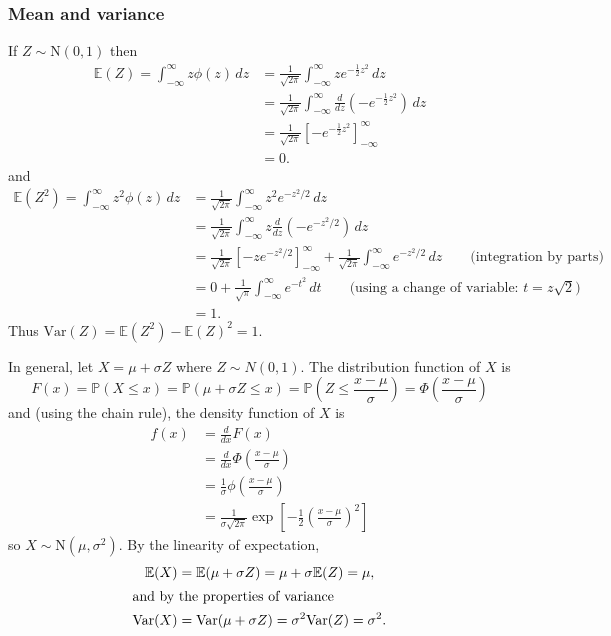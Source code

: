 \documentclass[lecture]{csm}
\newcommand{\prob}{\mathbb{P}}
\newcommand{\expe}{\mathbb{E}}
\newcommand{\var}{\text{Var}}
\begin{document}
\subsubsection*{Mean and variance}
If $Z\sim\text{N}(0,1)$ then
\begin{align*}
\expe(Z) = \int_{-\infty}^{\infty} z \phi(z) \,dz 
	& = \frac{1}{\sqrt{2\pi}}\int_{-\infty}^{\infty} z e^{-\frac{1}{2}z^2} \,dz \\
	& = \frac{1}{\sqrt{2\pi}}\int_{-\infty}^{\infty} \frac{d}{dz}(-e^{-\frac{1}{2}z^2}) \,dz \\
	& = \frac{1}{\sqrt{2\pi}}\left[ -e^{-\frac{1}{2}z^2} \right]_{-\infty}^{\infty} \\
	& = 0. 
\end{align*}
and
\begin{align*}
\expe(Z^2) 
	= \int_{-\infty}^{\infty} z^2 \phi(z)\,dz 
	& = \frac{1}{\sqrt{2\pi}}\int_{-\infty}^{\infty} z^2 e^{-z^2/2} \,dz \\
	& = \frac{1}{\sqrt{2\pi}}\int_{-\infty}^{\infty} z\frac{d}{dz}(-e^{-z^2/2}) \,dz \\
	& = \frac{1}{\sqrt{2\pi}}\left[ -ze^{-z^2/2} \right]_{-\infty}^{\infty} + \frac{1}{\sqrt{2\pi}}\int_{-\infty}^{\infty} e^{-z^2/2}\,dz \qquad\text{(integration by parts)}\\
	& = 0 + \frac{1}{\sqrt{\pi}}\int_{-\infty}^{\infty} e^{-t^2}\,dt \qquad\text{(using a change of variable: $t=z\sqrt{2}$)} \\
	& = 1.
\end{align*}	
Thus $\var(Z) = \expe(Z^2) - \expe(Z)^2 = 1.$

\vspace*{2ex}
In general, let $X=\mu+\sigma Z$ where $Z\sim N(0,1)$. The distribution function of $X$ is 
\[
F(x) 
	= \prob(X\leq x) 
	= \prob\left(\mu + \sigma Z \leq x\right) 
	= \prob\left(Z\leq \frac{x-\mu}{\sigma}\right) 
	= \Phi\left(\frac{x-\mu}{\sigma}\right)
\]
and (using the chain rule), the density function of $X$ is
\begin{align*}
f(x) 
	& = \frac{d}{dx}F(x) \\
	& = \frac{d}{dx}\Phi\left(\frac{x-\mu}{\sigma}\right) \\
	& = \frac{1}{\sigma}\phi\left(\frac{x-\mu}{\sigma}\right) \\
	& = \frac{1}{\sigma\sqrt{2\pi}}\exp\left[{-\displaystyle\frac{1}{2}\left(\frac{x-\mu}{\sigma}\right)^2}\right]
\end{align*}
so $X\sim\text{N}(\mu,\sigma^2)$. By the linearity of expectation, 
\begin{align*}
\expe(X)	& = \expe(\mu+\sigma Z) = \mu + \sigma\expe(Z) = \mu, \\
\intertext{and by the properties of variance}
\var(X)	& = \var(\mu+\sigma Z) = \sigma^2\var(Z) = \sigma^2.
\end{align*}
\end{document}
